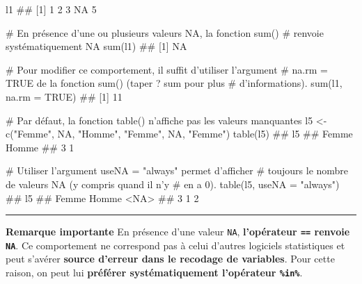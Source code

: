 \documentclass[12pt,twosided, notitlepage]{book}
\newenvironment{Shaded}{}{}
\newcommand{\CommentTok}[1]{\textcolor[rgb]{0.00,0.50,0.00}{#1}}
\newcommand{\DataTypeTok}[1]{#1}
\newcommand{\KeywordTok}[1]{\textcolor[rgb]{0.00,0.00,1.00}{#1}}
\newcommand{\NormalTok}[1]{#1}
\newcommand{\OperatorTok}[1]{#1}
\newcommand{\OtherTok}[1]{\textcolor[rgb]{1.00,0.25,0.00}{#1}}
\newcommand{\StringTok}[1]{\textcolor[rgb]{0.00,0.50,0.50}{#1}}
\renewenvironment{Shaded}{\begin{snugshade}}{\end{snugshade}}
\begin{document}
\begin{Shaded}
\begin{Highlighting}[]
\NormalTok{l1}
\NormalTok{  ## [1]  1  2  3 NA  5}

\CommentTok{# En présence d'une ou plusieurs valeurs NA, la fonction sum() }
\CommentTok{# renvoie systématiquement NA}
\KeywordTok{sum}\NormalTok{(l1)}
\NormalTok{  ## [1] NA}

\CommentTok{# Pour modifier ce comportement, il suffit d'utiliser l'argument }
\CommentTok{# na.rm = TRUE de la fonction sum() (taper ? sum pour plus }
\CommentTok{# d'informations).}
\KeywordTok{sum}\NormalTok{(l1, }\DataTypeTok{na.rm =} \OtherTok{TRUE}\NormalTok{)}
\NormalTok{  ## [1] 11}

\CommentTok{# Par défaut, la fonction table() n'affiche pas les valeurs manquantes}
\NormalTok{l5 <-}\StringTok{ }\KeywordTok{c}\NormalTok{(}\StringTok{"Femme"}\NormalTok{, }\OtherTok{NA}\NormalTok{, }\StringTok{"Homme"}\NormalTok{, }\StringTok{"Femme"}\NormalTok{, }\OtherTok{NA}\NormalTok{, }\StringTok{"Femme"}\NormalTok{)}
\KeywordTok{table}\NormalTok{(l5)}
\NormalTok{  ## l5}
\NormalTok{  ## Femme Homme }
\NormalTok{  ##     3     1}

\CommentTok{# Utiliser l'argument useNA = "always" permet d'afficher}
\CommentTok{# toujours le nombre de valeurs NA (y compris quand il n'y}
\CommentTok{# en a 0).}
\KeywordTok{table}\NormalTok{(l5, }\DataTypeTok{useNA =} \StringTok{"always"}\NormalTok{)}
\NormalTok{  ## l5}
\NormalTok{  ## Femme Homme  <NA> }
\NormalTok{  ##     3     1     2}
\end{Highlighting}
\end{Shaded}

\begin{center}\rule{0.5\linewidth}{\linethickness}\end{center}

\textbf{Remarque importante} En présence d'une valeur \texttt{NA},
\textbf{l'opérateur \texttt{==} renvoie \texttt{NA}}\index{\texttt{==}}.
Ce comportement ne correspond pas à celui d'autres logiciels
statistiques et peut s'avérer \textbf{source d'erreur dans le recodage
de variables}. Pour cette raison, on peut lui \textbf{préférer
systématiquement l'opérateur \texttt{\%in\%}}.

\begin{Shaded}
\end{Shaded}
\end{document}
